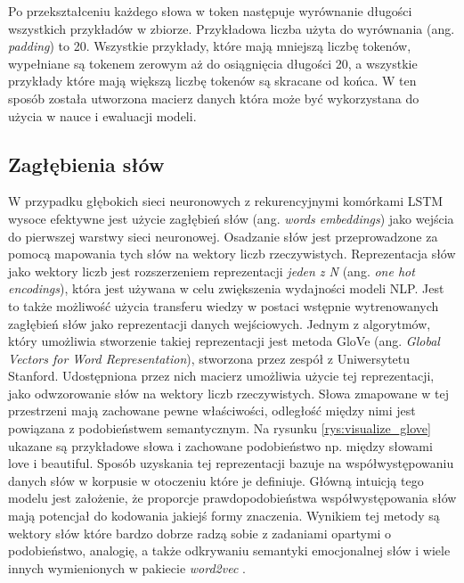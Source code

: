 Po przekształceniu każdego słowa w token następuje wyrównanie długości wszystkich przykładów w zbiorze. Przykładowa liczba użyta do wyrównania (ang. \textit{padding}) to 20. Wszystkie przykłady, które mają mniejszą liczbę tokenów, wypełniane są tokenem zerowym aż do osiągnięcia długości 20, a wszystkie przykłady które mają większą liczbę tokenów są skracane od końca. W ten sposób została utworzona macierz danych która może być wykorzystana do użycia w nauce i ewaluacji modeli.

\subsection{Zagłębienia słów}
\label{section:words_embeddings}

W przypadku głębokich sieci neuronowych z rekurencyjnymi komórkami LSTM wysoce efektywne jest użycie zagłębień słów (ang. \textit{words embeddings}) jako wejścia do pierwszej warstwy sieci neuronowej. Osadzanie słów jest przeprowadzone za pomocą mapowania tych słów na wektory liczb rzeczywistych. Reprezentacja słów jako wektory liczb jest rozszerzeniem reprezentacji \textit{jeden z N} (ang. \textit{one hot encodings}), która jest używana w celu zwiększenia wydajności modeli NLP. Jest to także możliwość użycia transferu wiedzy w postaci wstępnie wytrenowanych zagłębień słów jako reprezentacji danych wejściowych. Jednym z algorytmów, który umożliwia stworzenie takiej reprezentacji jest metoda GloVe  \cite{brochier2019global} (ang. \textit{Global Vectors for Word Representation}), stworzona przez zespół z Uniwersytetu Stanford. Udostępniona przez nich macierz umożliwia użycie tej reprezentacji, jako odwzorowanie słów na wektory liczb rzeczywistych. Słowa zmapowane w tej przestrzeni mają zachowane pewne właściwości, odległość między nimi jest powiązana z podobieństwem semantycznym. Na rysunku \ref{rys:visualize_glove} ukazane są przykładowe słowa i zachowane podobieństwo np. między słowami love i beautiful. Sposób uzyskania tej reprezentacji bazuje na współwystępowaniu danych słów w korpusie w otoczeniu które je definiuje. Główną intuicją tego modelu jest założenie, że proporcje prawdopodobieństwa współwystępowania słów mają potencjał do kodowania jakiejś formy znaczenia. Wynikiem tej metody są wektory słów które bardzo dobrze radzą sobie z zadaniami opartymi o podobieństwo, analogię, a także odkrywaniu semantyki emocjonalnej słów i wiele innych wymienionych w pakiecie \textit{word2vec} \cite{mikolov2013efficient}.

